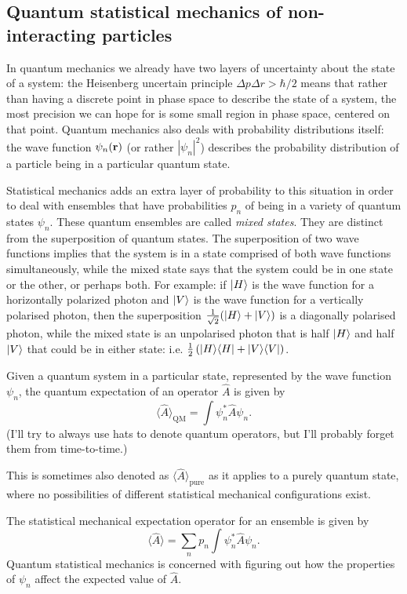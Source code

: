 \subsection{Quantum statistical mechanics of non-interacting particles}

In quantum mechanics we already have two layers of uncertainty about the state of a system: the Heisenberg uncertain principle $\Delta{p}\Delta {r}>{\hbar}/{2}$ means that rather than having a discrete point in phase space to describe the state of a system, the most precision we can hope for is some small region in phase space, centered on that point. Quantum mechanics also deals with probability distributions itself: the wave function $\psi_n({\bf r})$ (or rather $|\psi_n|^2$) describes the probability distribution of a particle being in a particular quantum state.

Statistical mechanics adds an extra layer of probability to this situation in order to deal with ensembles that have probabilities $p_n$ of being in a variety of quantum states $\psi_n$. These quantum ensembles are called \emph{mixed states}. They are distinct from the superposition of quantum states. The superposition of two wave functions implies that the system is in a state comprised of both wave functions simultaneously, while the mixed state says that the system could be in one state or the other, or perhaps both. For example: if $| H \rangle$
is the wave function for a horizontally polarized photon and $| V \rangle$ is the wave function for a vertically polarised photon, then the superposition $\frac{1}{\sqrt{2}}(| H \rangle+| V \rangle)$ is a diagonally polarised photon, while the mixed state is an unpolarised photon that is half $| H \rangle$ and half $| V \rangle$ that could be in either state:  i.e. $\frac12\left(| H \rangle\langle H |+| V \rangle\langle V |\right)$.

Given a quantum system in a particular state, represented by the wave function $\psi_n$, the quantum expectation of an operator $\hat{A}$ is given by
$$
	\langle\hat{A}\rangle_\text{QM} = \int\psi^*_n\hat{A}\psi_n.
$$
(I'll try to always use hats to denote quantum operators, but I'll probably forget them from time-to-time.)

This is sometimes also denoted as $\langle\hat{A}\rangle_\text{pure}$ as it applies to a purely quantum state, where no possibilities of different statistical mechanical configurations exist.

The statistical mechanical expectation operator for an ensemble is given by
$$
		\langle\hat{A}\rangle = \sum_n p_n\int\psi_n^*\hat{A}\psi_n.
$$
Quantum statistical mechanics is concerned with figuring out how the properties of $\psi_n$ affect the expected value of $\hat{A}$.

